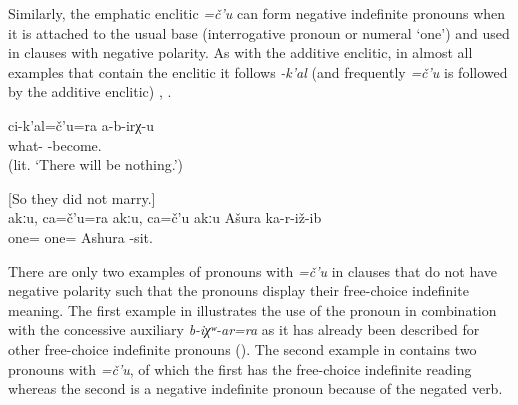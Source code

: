 Similarly, the emphatic enclitic \textit{=č'u} can form negative indefinite pronouns when it is attached to the usual base (interrogative pronoun or numeral `one') and used in clauses with negative polarity. As with the additive enclitic, in almost all examples that contain the enclitic it follows \textit{-k'al} (and frequently \textit{=č'u} is followed by the additive enclitic) , . 

\begin{exe}
	\ex	\label{ex:Nothing bad will happen.} 
	\gll	ci-k'al=č'u=ra	a-b-irχ-u\\
		what-	-become.\\
	\glt	{} (lit. `There will be nothing.')

	\ex	\label{ex:No, there was no one, except for Ashura he did not marry anyone.} [So they did not marry.]\\
	\gll	akːu,		ca=č'u=ra	akːu,	ca=č'u	akːu	Ašura	ka-r-iž-ib\\
				one=			one=		Ashura	-sit.\\
	\glt	{}
\end{exe}

There are only two examples of pronouns with \textit{=č'u} in clauses that do not have negative polarity such that the pronouns display their free-choice indefinite meaning. The first example in  illustrates the use of the pronoun in combination with the concessive auxiliary \textit{b-iχʷ-ar=ra} as it has already been described for other free-choice indefinite pronouns (). The second example in  contains two pronouns with \textit{=č'u}, of which the first has the free-choice indefinite reading whereas the second is a negative indefinite pronoun because of the negated verb.

